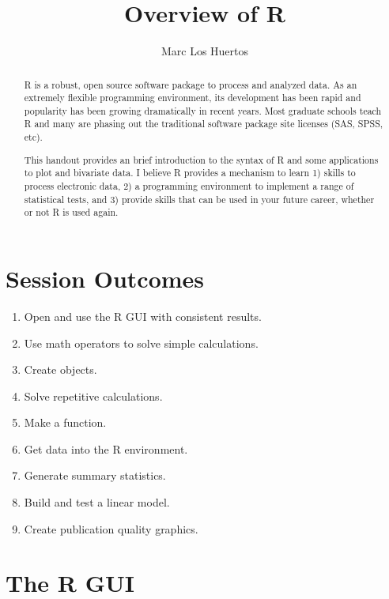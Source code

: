 \documentclass{tufte-handout}\usepackage[]{graphicx}\usepackage[]{xcolor}
\title{Overview of R %
}
\author[Marc Los Huertos]{Marc Los Huertos}
\date{}  %
\begin{document}
\maketitle%
\begin{abstract}
\noindent R is a robust, open source software package to process and analyzed data. As an extremely flexible programming environment, its development has been rapid and popularity has been growing dramatically in recent years. Most graduate schools teach R and many are phasing out the traditional software package site licenses (\eg SAS, SPSS, etc). 

This handout provides an brief introduction to the syntax of R and some applications to plot and bivariate data. I believe R provides a mechanism to learn 1) skills to process electronic data, 2) a programming environment to implement a range of statistical tests, and 3) provide skills that can be used in your future career, whether or not R is used again.
\end{abstract}




\section{Session Outcomes}
\begin{enumerate}
	\item Open and use the R GUI with consistent results.
	\item Use math operators to solve simple calculations.
	\item Create objects.
	\item Solve repetitive calculations.
	\item Make a function.
	\item Get data into the R environment.
	\item Generate summary statistics.
	\item Build and test a linear model.
	\item Create publication quality graphics.
\end{enumerate}

\section{The R GUI}
\end{document}
